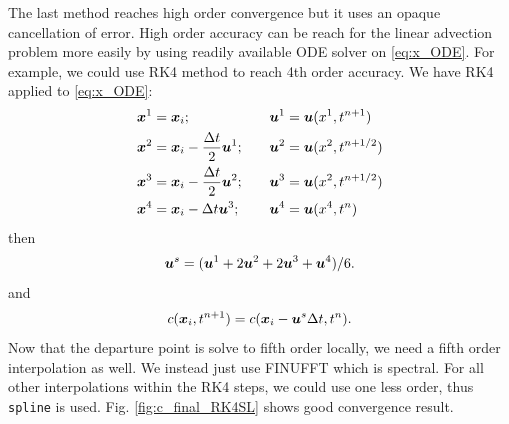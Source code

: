 \documentclass[11pt,letterpaper]{article}
\begin{document}
The last method reaches high order convergence but it uses an opaque cancellation of error. High order accuracy can be reach for the linear advection problem more easily by using readily available ODE solver on \eqref{eq:x_ODE}. For example, we could use RK4 method to reach 4th order accuracy. We have RK4 applied to \eqref{eq:x_ODE}:
\begin{align*}
    \boldsymbol{x}^1 &= \boldsymbol{x}_i;\quad &&\boldsymbol{u}^1 = \boldsymbol{u}(x^1,t^{n+1})\\
    \boldsymbol{x}^2 &= \boldsymbol{x}_i - \frac{\Delta t}{2} \boldsymbol{u}^1;\quad&&\boldsymbol{u}^2 = \boldsymbol{u}(x^2,t^{n+1/2})\\
    \boldsymbol{x}^3 &= \boldsymbol{x}_i - \frac{\Delta t}{2} \boldsymbol{u}^2;\quad&&\boldsymbol{u}^3 = \boldsymbol{u}(x^2,t^{n+1/2})\\
    \boldsymbol{x}^4 &= \boldsymbol{x}_i - \Delta t \boldsymbol{u}^3;\quad&&\boldsymbol{u}^4 = \boldsymbol{u}(x^4,t^{n})\\
\end{align*}
then
\begin{align*}
    \boldsymbol{u}^s = (\boldsymbol{u}^1+2\boldsymbol{u}^2+2\boldsymbol{u}^3+\boldsymbol{u}^4)/6.
\end{align*}
and 
\begin{align*}
    c(\boldsymbol{x}_i,t^{n+1}) = c(\boldsymbol{x}_i-\boldsymbol{u}^s\Delta t,t^{n}).
\end{align*}
Now that the departure point is solve to fifth order locally, we need a fifth order interpolation as well. We instead just use FINUFFT which is spectral. For all other interpolations within the RK4 steps, we could use one less order, thus \texttt{spline} is used. Fig. \ref{fig:c_final_RK4SL} shows good convergence result. 
\end{document}
